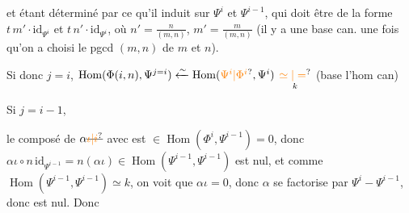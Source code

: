 et étant déterminé par ce qu'il induit sur $\Psi^i$ et $\Psi^{i-1}$, qui doit être de la forme $t\,m'\cdot\mathrm{id}_{\Psi^i}$ et $t\,n'\cdot\mathrm{id}_{\Psi^{i}}$, où $n'=\frac n{(m,n)}$, $m'=\frac m{(m,n)}$ (il y a une base can. une fois qu'on a choisi le pgcd $(m,n)$ de $m$ et $n$).



Si donc $j=i$, $\operatorname{Hom}(\Phi(i,n),\Psi^{j=i})\xleftarrow{\sim}\operatorname{Hom}(\unsure{\Psi^i|\Phi^i},\Psi^i)$ $\underset{k}{\unsure{\simeq|=}}$ (base l'hom can)

 Si $j=i-1$,


le composé de $\alpha\deleted{\unsure{\iota|i}}$ avec   est $\in\operatorname{Hom}(\Phi^i,\Psi^{i-1})=0$, donc   $\alpha\iota\circ n\,\mathrm{id}_{\Psi^{i-1}}=n(\alpha\iota)\in\operatorname{Hom}(\Psi^{i-1},\Psi^{i-1})$ est nul, et comme $\operatorname{Hom}(\Psi^{i-1},\Psi^{i-1})\simeq k$, on voit que $\alpha\iota=0$, donc $\alpha$  se factorise par $\Psi^i\mathrel{-}\Psi^{i-1}$, donc est nul. Donc

